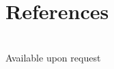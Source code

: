 \documentclass{article}
\begin{document}
\begin{multicols}{2}
\begin{itemize}
				
			\end{itemize}
	\end{multicols}

	\section*{\color{NavyBlue}References}
	\vspace{-0.5cm}
	{\color{NavyBlue}\hrulefill} \\
	Available upon request
\end{document}
